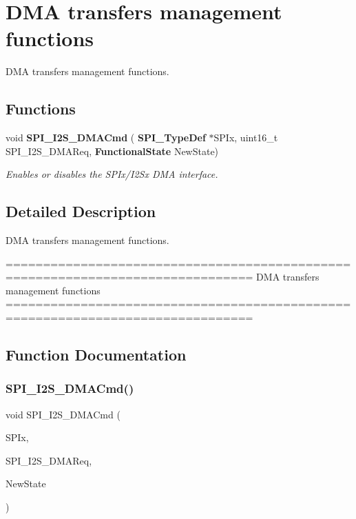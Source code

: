 \section{D\+MA transfers management functions}
\label{group__SPI__Group4}


D\+MA transfers management functions.  


\subsection*{Functions}
\begin{DoxyCompactItemize}
\item 
void \textbf{ S\+P\+I\+\_\+\+I2\+S\+\_\+\+D\+M\+A\+Cmd} (\textbf{ S\+P\+I\+\_\+\+Type\+Def} $\ast$S\+P\+Ix, uint16\+\_\+t S\+P\+I\+\_\+\+I2\+S\+\_\+\+D\+M\+A\+Req, \textbf{ Functional\+State} New\+State)
\begin{DoxyCompactList}\small\item\em Enables or disables the S\+P\+Ix/\+I2\+Sx D\+MA interface. \end{DoxyCompactList}\end{DoxyCompactItemize}


\subsection{Detailed Description}
D\+MA transfers management functions. 

\begin{DoxyVerb} ===============================================================================
                         DMA transfers management functions
 ===============================================================================  \end{DoxyVerb}
 

\subsection{Function Documentation}
\mbox{\label{group__SPI__Group4_gabed5b91a8576e6d578f364cc0e807e4a}} 
\subsubsection{S\+P\+I\+\_\+\+I2\+S\+\_\+\+D\+M\+A\+Cmd()}
{\footnotesize\ttfamily void S\+P\+I\+\_\+\+I2\+S\+\_\+\+D\+M\+A\+Cmd (\begin{DoxyParamCaption}\item[{\textbf{ S\+P\+I\+\_\+\+Type\+Def} $\ast$}]{S\+P\+Ix,  }\item[{uint16\+\_\+t}]{S\+P\+I\+\_\+\+I2\+S\+\_\+\+D\+M\+A\+Req,  }\item[{\textbf{ Functional\+State}}]{New\+State }\end{DoxyParamCaption})}




